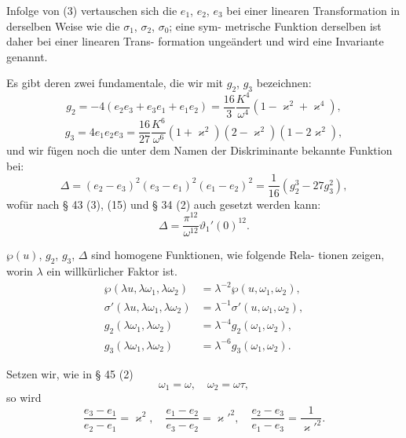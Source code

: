 \documentclass[12pt,a4paper]{article}
\theoremstyle{definition}
\begin{document}
Infolge von (3) vertauschen sich die $e_1$, $e_2$, $e_3$ bei einer linearen
Transformation in derselben Weise wie die $\sigma_1$, $\sigma_2$, $\sigma_0$; eine sym-
metrische Funktion derselben ist daher bei einer linearen Trans-
formation unge\"{a}ndert und wird eine Invariante genannt.

Es gibt deren zwei fundamentale, die wir mit $g_2$, $g_3$ bezeichnen:
\begin{equation}\tag{9}
g_2 = -4(e_2e_3 + e_3e_1 + e_1e_2) = \frac{16}{3} \frac{K^4}{\omega^4}(1 - \varkappa^2 + \varkappa^4),
\end{equation}
\begin{equation}\tag{10}
g_3 = 4e_1e_2e_3 = \frac{16}{27}\frac{K^6}{\omega^6}(1 + \varkappa^2)(2 - \varkappa^2)(1 - 2\varkappa^2),
\end{equation}
und wir f\"{u}gen noch die unter dem Namen der Diskriminante
bekannte Funktion bei:
\begin{equation}\tag{11}
\Delta = (e_2 - e_3)^2(e_3 - e_1)^2(e_1 - e_2)^2 = \frac{1}{16}(g_2^3 - 27g_3^2),
\end{equation}
wof\"{u}r nach \S{} 43 (3), (15) und \S{} 34 (2) auch gesetzt werden kann:
\begin{equation}\tag{12}
\Delta = \frac{\pi^{12}}{\omega^{12}} \vartheta_1'(0)^{12}.
\end{equation}

$\wp(u)$, $g_2$, $g_3$, $\Delta$ sind homogene Funktionen, wie folgende Rela-
tionen zeigen, worin $\lambda$ ein willk\"{u}rlicher Faktor ist.
\begin{equation}\tag{13}
\begin{aligned}
\wp(\lambda u, \lambda\omega_1, \lambda\omega_2) &= \lambda^{-2}\wp(u, \omega_1, \omega_2),\\
\sigma'(\lambda u, \lambda\omega_1, \lambda\omega_2) &= \lambda^{-1}\sigma'(u, \omega_1, \omega_2),\\
g_2(\lambda\omega_1, \lambda\omega_2) &= \lambda^{-4}g_2(\omega_1, \omega_2),\\
g_3(\lambda\omega_1, \lambda\omega_2) &= \lambda^{-6}g_3(\omega_1, \omega_2).
\end{aligned}
\end{equation}

Setzen wir, wie in \S{} 45 (2)
\[
\omega_1 = \omega, \quad \omega_2 = \omega\tau,
\]
so wird
\[
\frac{e_3 - e_1}{e_2 - e_1} = \varkappa^2, \quad
\frac{e_1 - e_2}{e_3 - e_2} = \varkappa'^2, \quad
\frac{e_2 - e_3}{e_1 - e_3} = \frac{1}{\varkappa'^2}.
\]
\end{document}
